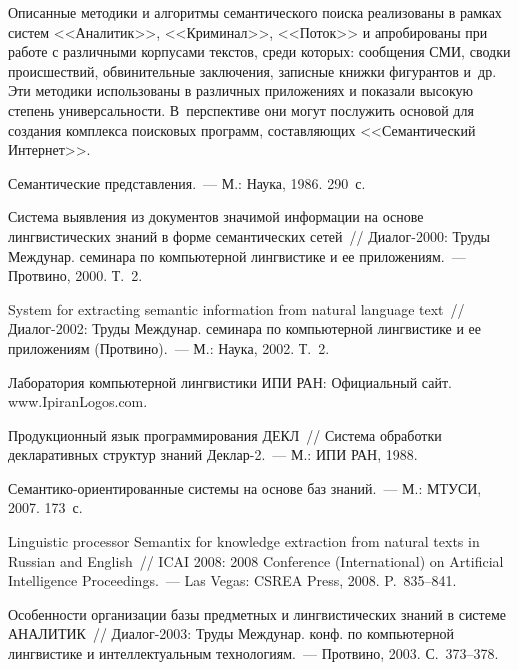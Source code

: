 \begin{multicols}{2}
    Описанные методики и алгоритмы семантического поиска реализованы в 
рамках систем <<Аналитик>>, <<Криминал>>, <<Поток>> и апробированы при 
работе с различными корпусами текстов, среди которых: сообщения СМИ, 
сводки происшествий, обвинительные заключения, записные книжки 
фигурантов и~др. Эти методики использованы в различных приложениях и 
показали высокую степень универсальности. В~перспективе они могут 
послужить основой для создания комплекса поисковых программ, 
составляющих <<Семантический Интернет>>.
    
       
    {\small\frenchspacing
{%
\begin{thebibliography}{99}

     Семантические представления.~--- М.: Наука, 1986. 290~с.
     
     Система выявления из документов значимой информации на основе лингвистических 
знаний в форме семантических сетей~// Диалог-2000: Труды Междунар. семинара по 
компьютерной лингвистике и ее приложениям.~--- Протвино, 2000.  Т.~2.
     
     System for extracting semantic information from natural language text~// Диалог-2002: 
Труды Междунар. семинара по компьютерной лингвистике и ее приложениям (Протвино).~--- 
М.: Наука, 2002. Т.~2.
     
     Лаборатория компьютерной лингвистики ИПИ РАН: Официальный сайт. {\sf 
www.IpiranLogos.com}.
     
     Продукционный язык программирования ДЕКЛ~// Система обработки декларативных 
структур знаний Деклар-2.~--- М.: ИПИ РАН, 1988.

     Семантико-ори\-ен\-ти\-ро\-ван\-ные системы на основе баз знаний.~--- М.: \mbox{МТУСИ}, 2007. 
173~с.
     
     Linguistic processor Semantix for knowledge extraction from natural texts in Russian and 
English~// ICAI 2008: 2008 Conference (International) on Artificial Intelligence Proceedings.~--- 
Las Vegas: CSREA Press, 2008. P.~835--841.
     
    
     Особенности организации базы предметных и лингвистических знаний в системе 
АНАЛИТИК~// Диа\-лог-2003: Труды Междунар. конф. по компьютерной лингвистике и 
интеллектуальным технологиям.~--- Протвино, 2003. С.~373--378.
     

\end{thebibliography}}}
\end{multicols}
